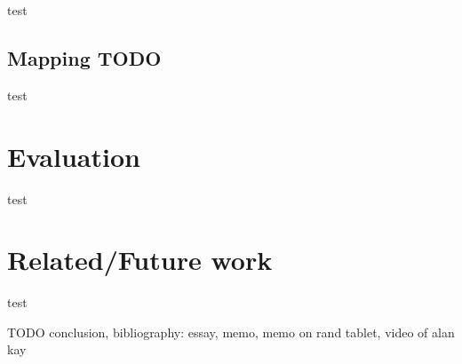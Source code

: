 \documentclass[sigconf]{acmart}
\begin{document}
test

\subsection{Mapping TODO}

test

\section{Evaluation}

test

\section{Related/Future work}

test

TODO conclusion, bibliography: essay, memo, memo on rand tablet, video of alan kay
\end{document}
